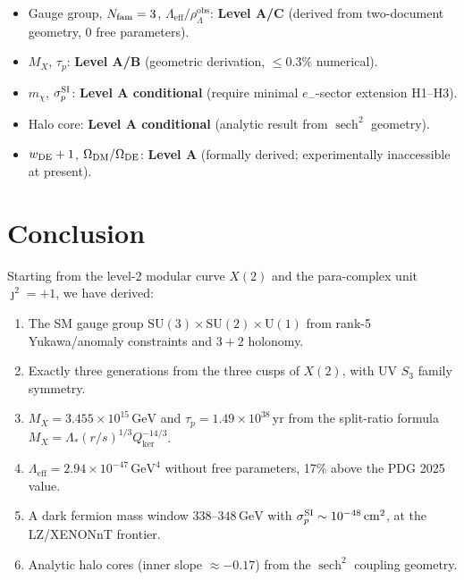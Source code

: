 \documentclass[12pt]{article}
\theoremstyle{plain}
\theoremstyle{definition}
\numberwithin{equation}{section}
\newcommand{\eff}{\mathrm{eff}}
\newcommand{\obs}{\mathrm{obs}}
\DeclareMathOperator{\sech}{sech}
\begin{document}
\begin{itemize}
\item Gauge group, $N_{\rm fam}=3$, $\Lambda_\eff/\rho_\Lambda^{\obs}$:
  \textbf{Level A/C} (derived from two-document geometry, 0 free parameters).
\item $M_X$, $\tau_p$: \textbf{Level A/B} (geometric derivation, $\leq0.3\%$ numerical).
\item $m_\chi$, $\sigma_p^{\rm SI}$: \textbf{Level A conditional}
  (require minimal $e_-$-sector extension H1--H3).
\item Halo core: \textbf{Level A conditional} (analytic result from $\sech^2$ geometry).
\item $w_{\rm DE}+1$, $\Omega_{\rm DM}/\Omega_{\rm DE}$: \textbf{Level A}
  (formally derived; experimentally inaccessible at present).
\end{itemize}

\section*{Conclusion}

Starting from the level-2 modular curve $X(2)$ and the para-complex unit
$\jmath^2=+1$, we have derived:

\begin{enumerate}
\item The SM gauge group $\mathrm{SU}(3)\times\mathrm{SU}(2)\times\mathrm{U}(1)$
  from rank-5 Yukawa/anomaly constraints and $3+2$ holonomy.
\item Exactly three generations from the three cusps of $X(2)$,
  with UV $S_3$ family symmetry.
\item $M_X=3.455\times10^{15}\,\mathrm{GeV}$ and $\tau_p=1.49\times10^{38}\,\mathrm{yr}$
  from the split-ratio formula $M_X=\Lambda_*(r/s)^{1/3}Q_{\ker}^{-14/3}$.
\item $\Lambda_\eff=2.94\times10^{-47}\,\mathrm{GeV}^4$ without free parameters,
  17\% above the PDG 2025 value.
\item A dark fermion mass window $338$--$348\,\mathrm{GeV}$ with
  $\sigma_p^{\rm SI}\sim10^{-48}\,\mathrm{cm}^2$, at the LZ/XENONnT frontier.
\item Analytic halo cores (inner slope $\approx-0.17$) from the $\sech^2$
  coupling geometry.
\end{enumerate}
\end{document}
